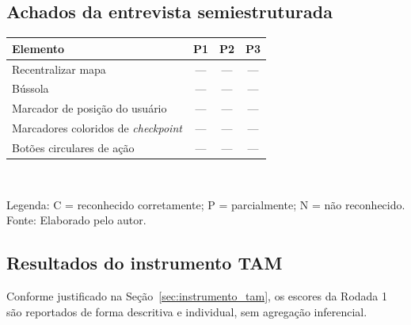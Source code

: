 \subsection{Achados da entrevista semiestruturada}


\begin{quadro}[htb]
\centering
\caption{Reconhecimento de ícones --- Rodada 1}
\label{quad:res_icones_r1}
\begin{tabular}{p{5.0cm} c c c}
\toprule
\textbf{Elemento} & \textbf{P1} & \textbf{P2} & \textbf{P3} \\
\midrule
Recentralizar mapa & --- & --- & --- \\
Bússola & --- & --- & --- \\
Marcador de posição do usuário & --- & --- & --- \\
Marcadores coloridos de \textit{checkpoint} & --- & --- & --- \\
Botões circulares de ação & --- & --- & --- \\
\bottomrule
\end{tabular}
\\[4pt]
\begin{flushleft}
Legenda: C = reconhecido corretamente; P = parcialmente; N = não reconhecido.\\
Fonte: Elaborado pelo autor.
\end{flushleft}
\end{quadro}

\subsection{Resultados do instrumento TAM}

Conforme justificado na Seção~\ref{sec:instrumento_tam}, os escores da Rodada 1 são
reportados de forma descritiva e individual, sem agregação inferencial.

